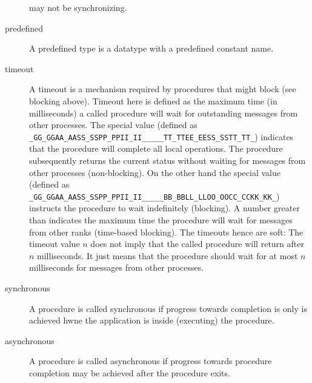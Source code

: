 \documentclass{article}
\makeatletter
\newlength{\st}\setlength{\st}{0pt}
\newcommand{\zerowsep}{\hskip 0pt plus 0.1pt minus 0.1pt}
\newcommand{\ZSEP}[1]{\ifx#1\@@@EOZ@@@\let\next\relax\else\ifx#1\_#1\zerowsep\else#1\fi\let\next\ZSEP\fi\next}
\newcommand{\zsep}[1]{\ZSEP{}#1\@@@EOZ@@@}
\newcommand{\GASPITEST}{{\tt\protect\zsep{GASPI\_TEST}}}
\newcommand{\GASPIBLOCK}{{\tt\protect\zsep{GASPI\_BLOCK}}}
\makeatother
\begin{document}
\begin{description}
  may not be synchronizing.
\item[predefined] A predefined type is a datatype with a predefined
  constant name.
\item[timeout]  A timeout is a mechanism required by procedures that
  might block (see blocking above). Timeout here is defined as the maximum
  time (in milliseconds) a called procedure will wait for outstanding messages
  from other processes. The special value   (defined as \GASPITEST{}) indicates
  that the procedure will complete all local operations. The procedure subsequently returns
  the current status without waiting for messages from other processes (non-blocking). On the other hand the
  special value  (defined as \GASPIBLOCK{}) instructs the procedure to wait indefinitely (blocking).
  A number greater than  indicates the maximum time the procedure will wait for
  messages from other ranks (time-based blocking).  The timeouts hence are soft: The timeout value $n$ does
  not imply that the called procedure will return after $n$  milliseconds. It just means that the procedure should wait for at
  most $n$ milliseconds for messages from other processes.
\item[synchronous]
  A procedure is called synchronous if progress towards 
  completion is only is achieved hwne the application is inside (executing) the procedure.
\begin{center}
\end{center}
\item[asynchronous]
  A procedure is called asynchronous if progress towards procedure
  completion may be achieved after the procedure exits.
\begin{center}
\end{center}

\end{description}
\end{document}

